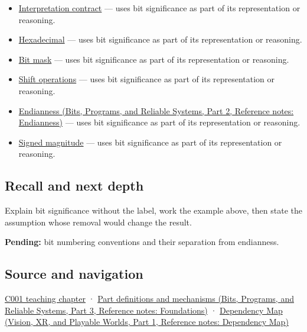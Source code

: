 \begin{itemize}
\tightlist
\item
  \hyperref[appendix-f414bd4ed05c]{Interpretation contract} --- uses bit significance as part of its representation or reasoning.
\item
  \hyperref[appendix-6b8075763724]{Hexadecimal} --- uses bit significance as part of its representation or reasoning.
\item
  \hyperref[appendix-dbe5905163c2]{Bit mask} --- uses bit significance as part of its representation or reasoning.
\item
  \hyperref[appendix-73425b25118e]{Shift operations} --- uses bit significance as part of its representation or reasoning.
\item
  \href{../01-Bits-Programs-and-Reliable-Systems-P02/main.pdf\#nameddest=appendix-bc07c3d25b18}{Endianness (Bits, Programs, and Reliable Systems, Part 2, Reference notes: Endianness)} --- uses bit significance as part of its representation or reasoning.
\item
  \hyperref[appendix-ce20506c8532]{Signed magnitude} --- uses bit significance as part of its representation or reasoning.
\end{itemize}

\subsection{Recall and next depth}\label{appendix-280445746493-recall-and-next-depth}

\hypertarget{appendix-280445746493-recall-and-next-depth}{}

Explain bit significance without the label, work the example above, then state the assumption whose removal would change the result.

\textbf{Pending:} bit numbering conventions and their separation from endianness.

\subsection{Source and navigation}\label{appendix-280445746493-source-and-navigation}

\hypertarget{appendix-280445746493-source-and-navigation}{}

\hyperref[01-foundations-i-ch001-from-a-signal-to-an-interpretation]{C001 teaching chapter} · \href{../01-Bits-Programs-and-Reliable-Systems-P03/main.pdf\#nameddest=appendix-fd090d982a15}{Part definitions and mechanisms (Bits, Programs, and Reliable Systems, Part 3, Reference notes: Foundations)} · \href{../07-Vision-XR-and-Playable-Worlds-P01/main.pdf\#nameddest=appendix-4ad47bdd269a}{Dependency Map (Vision, XR, and Playable Worlds, Part 1, Reference notes: Dependency Map)}
